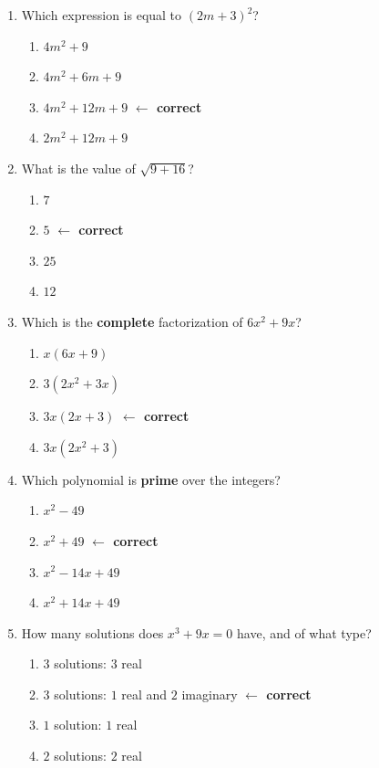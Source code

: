 \begin{enumerate}[leftmargin=1.8em, itemsep=6pt, topsep=5pt]
\small

\item Which expression is equal to $(2m+3)^2$?
\begin{enumerate}[label=(\Alph*), leftmargin=2.2em, itemsep=1pt, topsep=2pt]
  \item $4m^2+9$
  \item $4m^2+6m+9$
  \item $4m^2+12m+9$ \quad \textcolor{keyred}{\textbf{$\leftarrow$ correct}}
  \item $2m^2+12m+9$
\end{enumerate}

\item What is the value of $\sqrt{9+16}$?
\begin{enumerate}[label=(\Alph*), leftmargin=2.2em, itemsep=1pt, topsep=2pt]
  \item $7$
  \item $5$ \quad \textcolor{keyred}{\textbf{$\leftarrow$ correct}}
  \item $25$
  \item $12$
\end{enumerate}

\item Which is the \textbf{complete} factorization of $6x^2+9x$?
\begin{enumerate}[label=(\Alph*), leftmargin=2.2em, itemsep=1pt, topsep=2pt]
  \item $x(6x+9)$
  \item $3(2x^2+3x)$
  \item $3x(2x+3)$ \quad \textcolor{keyred}{\textbf{$\leftarrow$ correct}}
  \item $3x(2x^2+3)$
\end{enumerate}

\item Which polynomial is \textbf{prime} over the integers?
\begin{enumerate}[label=(\Alph*), leftmargin=2.2em, itemsep=1pt, topsep=2pt]
  \item $x^2-49$
  \item $x^2+49$ \quad \textcolor{keyred}{\textbf{$\leftarrow$ correct}}
  \item $x^2-14x+49$
  \item $x^2+14x+49$
\end{enumerate}

\item How many solutions does $x^3+9x=0$ have, and of what type?
\begin{enumerate}[label=(\Alph*), leftmargin=2.2em, itemsep=1pt, topsep=2pt]
  \item $3$ solutions: $3$ real
  \item $3$ solutions: $1$ real and $2$ imaginary \quad \textcolor{keyred}{\textbf{$\leftarrow$ correct}}
  \item $1$ solution: $1$ real
  \item $2$ solutions: $2$ real
\end{enumerate}


\end{enumerate}
